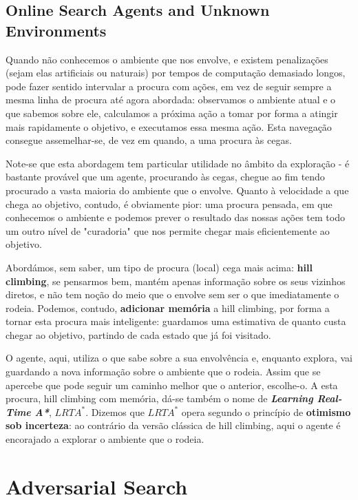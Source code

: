 \documentclass[11pt]{article}
\begin{document}
\subsection{Online Search Agents and Unknown Environments}

Quando não conhecemos o ambiente que nos envolve, e existem penalizações (sejam elas artificiais ou naturais) por tempos de computação demasiado longos, pode fazer sentido intervalar a procura com ações, em vez de seguir sempre a mesma linha de procura até agora abordada: observamos o ambiente atual e o que sabemos sobre ele, calculamos a próxima ação a tomar por forma a atingir mais rapidamente o objetivo, e executamos essa mesma ação. Esta navegação consegue assemelhar-se, de vez em quando, a uma procura às cegas.\vspace{4pt}

Note-se que esta abordagem tem particular utilidade no âmbito da exploração - é bastante provável que um agente, procurando às cegas, chegue ao fim tendo procurado a vasta maioria do ambiente que o envolve. Quanto à velocidade a que chega ao objetivo, contudo, é obviamente pior: uma procura pensada, em que conhecemos o ambiente e podemos prever o resultado das nossas ações tem todo um outro nível de "curadoria" que nos permite chegar mais eficientemente ao objetivo.\vspace{4pt}

Abordámos, sem saber, um tipo de procura (local) cega mais acima: \textbf{hill climbing}, se pensarmos bem, mantém apenas informação sobre os seus vizinhos diretos, e não tem noção do meio que o envolve sem ser o que imediatamente o rodeia. Podemos, contudo, \textbf{adicionar memória} a hill climbing, por forma a tornar esta procura mais inteligente: guardamos uma estimativa de quanto custa chegar ao objetivo, partindo de cada estado que já foi visitado.\vspace{4pt}

O agente, aqui, utiliza o que sabe sobre a sua envolvência e, enquanto explora, vai guardando a nova informação sobre o ambiente que o rodeia. Assim que se apercebe que pode seguir um caminho melhor que o anterior, escolhe-o. A esta procura, hill climbing com memória, dá-se também o nome de \textbf{\textit{Learning Real-Time A*}}, $LRTA^*$. Dizemos que $LRTA^*$ opera segundo o princípio de \textbf{otimismo sob incerteza}: ao contrário da versão clássica de hill climbing, aqui o agente é encorajado a explorar o ambiente que o rodeia.


\newpage
\section{Adversarial Search}
\end{document}

